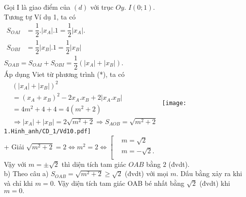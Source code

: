 \begin{vd}
{{		Gọi I là giao điểm của $\left( d \right)$ với trục $Oy$. $I\left( 0;1 \right)$.\\
		Tương tự Ví dụ 1, %
		ta có\\
		$\begin{aligned}
			{{S}_{OAI}}&=\dfrac{1}{2}.\left| {{x}_{A}} \right|.1=\dfrac{1}{2}\left| {{x}_{A}} \right|.\\
			{{S}_{OBI}}&=\dfrac{1}{2}\left| {{x}_{B}} \right|.1=\dfrac{1}{2}\left| {{x}_{B}} \right|
		\end{aligned}$ 
		\\ 
		$
			{{S}_{OAB}}={{S}_{OAI}}+{{S}_{OBI}}  =\dfrac{1}{2}\left( \left| {{x}_{A}} \right|+\left| {{x}_{B}} \right| \right). 
		$\\
		Áp dụng Viet từ phương trình (*), ta có\\
		$\begin{aligned}
			&{{\left( \left| {{x}_{A}} \right|+\left| {{x}_{B}} \right| \right)}^{2}}\\
			&={{\left( {{x}_{A}}+{{x}_{B}} \right)}^{2}}-2{{x}_{A}}.{{x}_{B}}
			+2\left| {{x}_{A}}.{{x}_{B}} \right|\\
			&=4{{m}^{2}}+4+4=4\left( {{m}^{2}}+2 \right)\\
			&\Rightarrow \left| {{x}_{A}} \right|+\left| {{x}_{B}} \right|=2\sqrt{{{m}^{2}}+2}\Rightarrow {{S}_{AOB}}=\sqrt{{{m}^{2}}+2}
		\end{aligned}$
		}
		{
			\texttt{[image: 1.Hinh\_anh/CD\_1/Vd10.pdf]}
		}\\		
		+ Giải $\sqrt{{{m}^{2}}+2}=2\Leftrightarrow {{m}^{2}}=2\Leftrightarrow \left[ \begin{aligned}
			& m=\sqrt{2} \\ 
			& m=-\sqrt{2}.\\ 
		\end{aligned} \right.$\\
		Vậy với $m=\pm \sqrt{2}$ thì diện tích tam giác $OAB$ bằng $2$ (đvdt).\\
		b) Theo câu a) ${{S}_{OAB}}=\sqrt{{{m}^{2}}+2}\ge \sqrt{2}$ (đvdt) với mọi $m.$ 
		Dấu bằng xảy ra khi và chỉ khi $m=0.$
		Vậy diện tích tam giác OAB bé nhất bằng $\sqrt{2}$ (đvdt) khi $m=0.$ 
		
	}
\end{vd}
